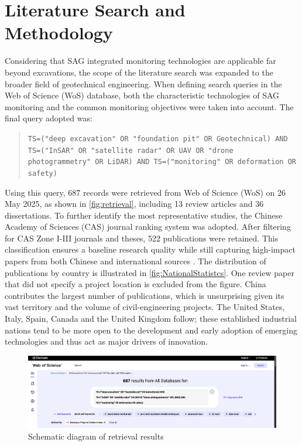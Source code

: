 \documentclass[preprint,11pt,authoryear,3p]{elsarticle}
\begin{document}
\section{Literature Search and Methodology}

Considering that SAG integrated monitoring technologies are applicable far beyond excavations, the scope of the literature search was expanded to the broader field of geotechnical engineering. When defining search queries in the Web of Science (WoS) database, both the characteristic technologies of SAG monitoring and the common monitoring objectives were taken into account. The final query adopted was:

\begin{quote}
\texttt{TS=("deep excavation" OR "foundation pit" OR Geotechnical) AND
TS=("InSAR" OR "satellite radar" OR UAV OR "drone photogrammetry" OR LiDAR) AND
TS=("monitoring" OR deformation OR safety)}
\end{quote}

Using this query, 687 records were retrieved from Web of Science (WoS) on 26 May 2025, as shown in \autoref{fig:retrieval}, including 13 review articles and 36 dissertations. To further identify the most representative studies, the Chinese Academy of Sciences (CAS) journal ranking system was adopted. After filtering for CAS Zone I-III journals and theses, 522 publications were retained. This classification ensures a baseline research quality while still capturing high-impact papers from both Chinese and international sources \citep{nature:v641}. The distribution of publications by country is illustrated in \autoref{fig:NationalStatistcs}. One review paper that did not specify a project location is excluded from the figure. China contributes the largest number of publications, which is unsurprising given its vast territory and the volume of civil-engineering projects. The United States, Italy, Spain, Canada and the United Kingdom follow; these established industrial nations tend to be more open to the development and early adoption of emerging technologies and thus act as major drivers of innovation.

\begin{figure}[htbp]
    \centering
    \includegraphics[width=\textwidth]{imgs/advanceSearch.png}
    \caption{Schematic diagram of retrieval results}
    \label{fig:retrieval}
\end{figure}
\end{document}
